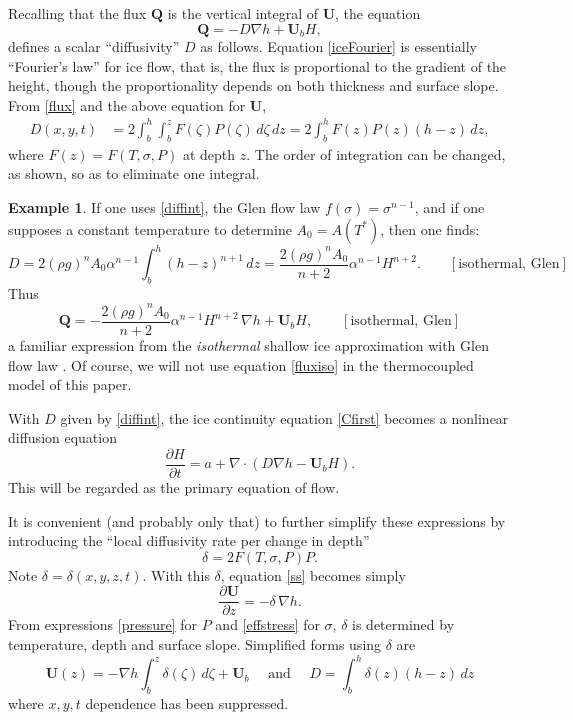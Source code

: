 \documentclass[12pt,final]{amsart}%
\theoremstyle{plain}
\theoremstyle{definition}
\newtheorem*{example}{Example}
\theoremstyle{remark}
\newcommand{\ddt}[1]{\ensuremath{\frac{\partial #1}{\partial t}}}
\newcommand{\ddz}[1]{\ensuremath{\frac{\partial #1}{\partial z}}}
\newcommand{\diverg}{\nabla\cdot}
\newcommand{\grad}{\nabla}
\newcommand{\bQ}{{\mathbf{Q}}}
\newcommand{\bU}{{\mathbf{U}}}
\begin{document}
Recalling that the flux $\bQ$ is the vertical integral of $\bU$, the equation
\begin{equation}\label{iceFourier}
\bQ = - D\grad h + \bU_b H,
\end{equation}
defines a scalar ``diffusivity'' $D$ \citep{vanderVeen} as follows.  Equation \eqref{iceFourier} is essentially ``Fourier's law'' for ice flow, that is, the flux is proportional to the gradient of the height, though the proportionality depends on both thickness and surface slope.  From \eqref{flux} and the above equation for $\bU$,
\begin{align}\label{diffint}
D(x,y,t) &= 2 \int_{b}^h \int_{b}^z F(\zeta) P(\zeta)\,d\zeta\,dz = 2 \int_{b}^h F(z)P(z)(h-z)\,dz,
\end{align}
where $F(z)=F(T,\sigma,P)$ at depth $z$.  The order of integration can be changed, as shown, so as to eliminate one integral.

\begin{example} If one uses \eqref{diffint}, the Glen flow law $f(\sigma)=\sigma^{n-1}$, and if one supposes a constant temperature to determine $A_0=A(T^*)$, then one finds:
    $$D=2(\rho g)^n A_0 \alpha^{n-1} \int_{b}^h (h-z)^{n+1}\,dz=\frac{2(\rho g)^n A_0}{n+2} \alpha^{n-1} H^{n+2}. \qquad [\text{isothermal, Glen}]$$
Thus
\begin{equation}\label{fluxiso}
\bQ=-\frac{2(\rho g)^n A_0}{n+2} \alpha^{n-1} H^{n+2} \, \grad h + \bU_b H, \qquad [\text{isothermal, Glen}]\end{equation}
a familiar expression from the \emph{isothermal} shallow ice approximation with Glen flow law \citep{EISMINT96,Paterson}.  Of course, we will not use equation \eqref{fluxiso} in the thermocoupled model of this paper.\end{example}

With $D$ given by \eqref{diffint}, the ice continuity equation \eqref{Cfirst} becomes a nonlinear diffusion equation
\begin{equation}\label{Cdiffform}
\ddt{H} = a + \diverg \left(D \grad h -\bU_b H\right).
\end{equation}
This will be regarded as the primary equation of flow.

It is convenient (and probably only that) to further simplify these expressions by introducing the ``local diffusivity rate per change in depth''
    $$\delta = 2 F(T,\sigma,P) P.$$
Note $\delta=\delta(x,y,z,t)$.  With this $\delta$, equation \eqref{ss} becomes simply
	$$\ddz{\bU} = - \delta \, \grad h.$$
From expressions \eqref{pressure} for $P$ and \eqref{effstress} for $\sigma$, $\delta$ is determined by temperature, depth and surface slope.  Simplified forms using $\delta$ are
\begin{equation}\label{UDsimp}
  \bU(z) = - \grad h \int_{b}^z \delta(\zeta) \,d\zeta + \bU_b \quad \text{ and } \quad D = \int_{b}^h \delta(z) (h-z) \,dz
\end{equation}
where $x,y,t$ dependence has been suppressed.
\end{document}
